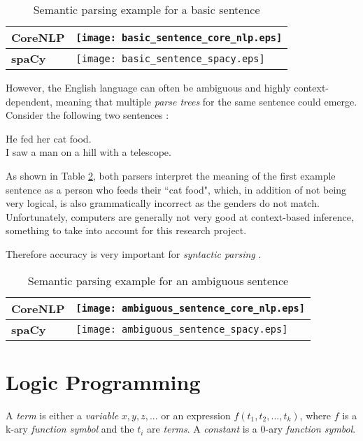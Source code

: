 \begin{table}[H]
\centering
\begin{tabular}{@{}ll@{}}
\toprule
\textbf{CoreNLP} & \texttt{[image: basic\_sentence\_core\_nlp.eps]} \\ \midrule
\textbf{spaCy} & \texttt{[image: basic\_sentence\_spacy.eps]}  \\ \bottomrule
\end{tabular}
\caption{Semantic parsing example for a basic sentence}
\label{table:basic_sentence}
\end{table}

However, the English language can often be ambiguous and highly context-dependent, meaning that multiple \textit{parse trees} for the same sentence could emerge. Consider the following two sentences \cite{noauthor_studying_nodate}:
\begin{displayquote}
He fed her cat food. \\
I saw a man on a hill with a telescope.
\end{displayquote}
As shown in Table \ref{table:ambiguous_sentence}, both parsers interpret the meaning of the first example sentence as a person who feeds their ``cat food", which, in addition of not being very logical, is also grammatically incorrect as the genders do not match. Unfortunately, computers are generally not very good at context-based inference, something to take into account for this research project.

Therefore accuracy is very important for \textit{syntactic parsing} \cite{gomez-rodriguez_how_2019}.

\begin{table}[H]
\centering
\begin{tabular}{@{}ll@{}}
\toprule
\textbf{CoreNLP} & \texttt{[image: ambiguous\_sentence\_core\_nlp.eps]} \\ \midrule
\textbf{spaCy} & \texttt{[image: ambiguous\_sentence\_spacy.eps]}  \\ \bottomrule
\end{tabular}
\caption{Semantic parsing example for an ambiguous sentence}
\label{table:ambiguous_sentence}
\end{table}

\section{Logic Programming}

\begin{definition}
A \textit{term} is either a \textit{variable} $x,y,z,...$ or an expression $f(t_1,t_2,...,t_k)$, where $f$ is a k-ary \textit{function symbol} and the $t_i$ are \textit{terms}. A \textit{constant} is a 0-ary \textit{function symbol}.
\end{definition}

